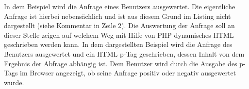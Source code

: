 

In dem Beispiel wird die Anfrage eines Benutzers ausgewertet. Die
eigentliche Anfrage ist hierbei nebensächlich und ist aus diesem Grund im
Listing nicht dargestellt (siehe Kommentar in Zeile 2). Die Auswertung der
Anfrage soll an dieser Stelle zeigen auf welchem Weg mit Hilfe von PHP
dynamisches HTML geschrieben werden kann. In dem dargestellten Beispiel wird die
Anfrage des Benutzers ausgewertet und ein HTML p-Tag geschrieben, dessen Inhalt
von dem Ergebnis der Abfrage abhängig ist. Dem Benutzer wird durch die Ausgabe
des p-Tags im Browser angezeigt, ob seine Anfrage positiv oder negativ
ausgewertet wurde.